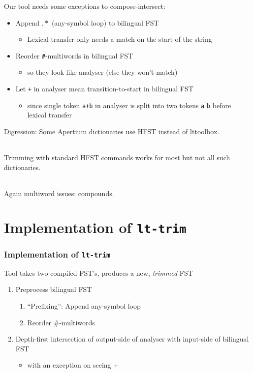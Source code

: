 \documentclass[notes=hide]{beamer}
\newcommand{\ana}[1]{\texttt{#1}}
\newcommand{\tool}[1]{\texttt{#1}}
\begin{document}
\begin{frame}
  Our tool needs some exceptions to compose-intersect:
  \begin{itemize}
  \item Append $.*$ (any-symbol loop) to bilingual FST
    \begin{itemize}
    \item Lexical transfer only needs a match on the start of the
      string
    \end{itemize}

  \item Reorder \ana{\#}-multiwords in bilingual FST
    \begin{itemize}
    \item so they look like analyser (else they won't match)
    \end{itemize}

  \item Let \ana{+} in analyser mean transition-to-start in bilingual
    FST
    \begin{itemize}
    \item since single token \ana{a+b} in analyser is split into two
      tokens \ana{a} \ana{b} before lexical transfer
    \end{itemize}

  \end{itemize}
\end{frame}

\begin{frame}
  Digression: Some Apertium dictionaries use HFST instead of
  lttoolbox.

  ~\\

  Trimming with standard HFST commands works for most but not all such
  dictionaries.

  ~\\

  Again multiword issues: compounds.
\end{frame}

\section{Implementation of \tool{lt-trim}}
\begin{frame}
  \frametitle{Implementation of \tool{lt-trim}}
  Tool takes two compiled FST's, produces a new, \emph{trimmed} FST
  \begin{enumerate}
  \item Preprocess bilingual FST
    \begin{enumerate}
    \item ``Prefixing'': Append any-symbol loop
    \item Reorder \#-multiwords
    \end{enumerate}
  \item Depth-first intersection of output-side of analyser with
    input-side of bilingual FST
    \begin{itemize}
    \item with an exception on seeing +
    \end{itemize}
  \end{enumerate}
\end{frame}
\end{document}
